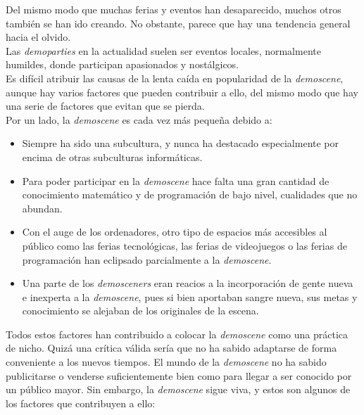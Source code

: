 Del mismo modo que muchas ferias y eventos han desaparecido, muchos otros también se han ido creando. No obstante, parece que hay una tendencia general hacia el olvido.\\

Las \emph{demoparties} en la actualidad suelen ser eventos locales, normalmente humildes, donde participan apasionados y nostálgicos.\\

Es difícil atribuir las causas de la lenta caída en popularidad de la \emph{demoscene}, aunque hay varios factores que pueden contribuir a ello, del mismo modo que hay una serie de factores que evitan que se pierda.\\

Por un lado, la \emph{demoscene} es cada vez más pequeña debido a:

\begin{itemize}
  \item Siempre ha sido una subcultura, y nunca ha destacado especialmente por encima de otras subculturas informáticas.
  \item Para poder participar en la \emph{demoscene} hace falta una gran cantidad de conocimiento matemático y de programación de bajo nivel, cualidades que no abundan.
  \item Con el auge de los ordenadores, otro tipo de espacios más accesibles al público como las ferias tecnológicas, las ferias de videojuegos o las ferias de programación han eclipsado parcialmente a la \emph{demoscene}.
  \item Una parte de los \emph{demosceners} eran reacios a la incorporación de gente nueva e inexperta a la \emph{demoscene}, pues si bien aportaban sangre nueva, sus metas y conocimiento se alejaban de los originales de la escena.
\end{itemize}

Todos estos factores han contribuido a colocar la \emph{demoscene} como una práctica de nicho. Quizá una crítica válida sería que no ha sabido adaptarse de forma conveniente a los nuevos tiempos. El mundo de la \emph{demoscene} no ha sabido publicitarse o venderse suficientemente bien como para llegar a ser conocido por un público mayor. Sin embargo, la \emph{demoscene} sigue viva, y estos son algunos de los factores que contribuyen a ello:

